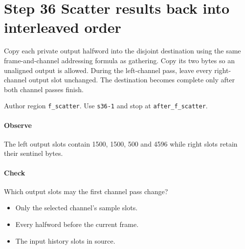 \section{Step 36 Scatter results back into interleaved order}\label{pcm-wav-s36}
Copy each private output halfword into the disjoint destination using the same frame-and-channel addressing formula as gathering. Copy its two bytes so an unaligned output is allowed. During the left-channel pass, leave every right-channel output slot unchanged. The destination becomes complete only after both channel passes finish.

Author region \texttt{f\_scatter}. Use \texttt{s36-1} and stop at \texttt{after\_f\_scatter}.

\paragraph{Observe} The left output slots contain 1500, 1500, 500 and 4596 while right slots retain their sentinel bytes.

\paragraph{Check} Which output slots may the first channel pass change?
\begin{itemize}
  \item[A.] Only the selected channel's sample slots.
  \item[B.] Every halfword before the current frame.
  \item[C.] The input history slots in source.
\end{itemize}
